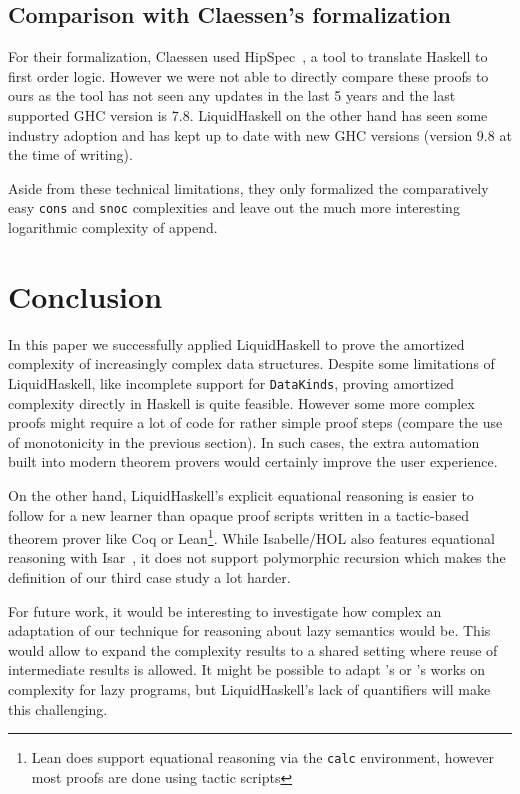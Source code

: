 \documentclass[sigplan,screen]{acmart}
\begin{document}
\subsection{Comparison with Claessen's formalization}

For their formalization, Claessen used HipSpec~\cite{hipspec}, a tool to translate Haskell to first order logic. However we were not able to directly compare these proofs to ours as the tool has not seen any updates in the last 5 years and the last supported GHC version is 7.8. LiquidHaskell on the other hand has seen some industry adoption and has kept up to date with new GHC versions (version 9.8 at the time of writing).

Aside from these technical limitations, they only formalized the comparatively easy \texttt{cons} and \texttt{snoc} complexities and leave out the much more interesting logarithmic complexity of append.

\section{Conclusion}\label{sec:conclusion}

In this paper we successfully applied LiquidHaskell to prove the amortized complexity of increasingly complex data structures. Despite some limitations of LiquidHaskell, like incomplete support for \texttt{DataKinds}, proving amortized complexity directly in Haskell is quite feasible. However some more complex proofs might require a lot of code for rather simple proof steps (compare the use of monotonicity in the previous section). In such cases, the extra automation built into modern theorem provers would certainly improve the user experience.

On the other hand, LiquidHaskell's explicit equational reasoning is easier to follow for a new learner than opaque proof scripts written in a tactic-based theorem prover like Coq or Lean\footnote{Lean does support equational reasoning via the \texttt{calc} environment, however most proofs are done using tactic scripts}. While Isabelle/HOL also features equational reasoning with Isar~\cite{isar}, it does not support polymorphic recursion which makes the definition of our third case study a lot harder.

For future work, it would be interesting to investigate how complex an adaptation of our technique for reasoning about lazy semantics would be. This would allow to expand the complexity results to a shared setting where reuse of intermediate results is allowed. It might be possible to adapt \citet{forking_paths}'s or \citet{lazyfunction}'s works on complexity for lazy programs, but LiquidHaskell's lack of quantifiers will make this challenging.
\end{document}
